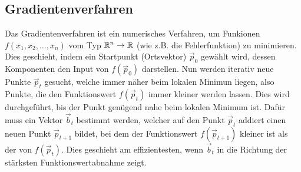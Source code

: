 \begin{appendices}

\chapter{Gradientenverfahren}\label{sec:anhang_gd}
Das Gradientenverfahren ist ein numerisches Verfahren, um Funkionen $f(x_1,
x_2, \ldots, x_n)$ vom Typ $\mathbb{R}^n \to \mathbb{R}$ (wie z.B. die Fehlerfunktion)
zu minimieren.
Dies geschieht, indem ein Startpunkt (Ortsvektor) $\vec{p}_0$ gewählt wird, dessen
Komponenten den Input von $f(\vec{p}_0)$ darstellen.
Nun werden iterativ neue Punkte $\vec{p}_t$ gesucht, welche immer näher beim lokalen Minimun liegen, also Punkte, die den Funktionswert $f(\vec{p}_t)$ immer kleiner werden lassen.
Dies wird durchgeführt, bis der Punkt genügend nahe beim lokalen Minimum ist.
\para{}
Dafür muss ein Vektor $\vec{b}_t$ bestimmt werden, welcher auf den Punkt $\vec{p}_t$ addiert einen neuen Punkt $\vec{p}_{t+1}$ bildet,
bei dem der Funktionswert $f(\vec{p}_{t+1})$ kleiner ist als der von $f(\vec{p}_t)$.
Dies geschieht am effizientesten, wenn $\vec{b}_t$ in die Richtung der stärksten Funktionswertabnahme zeigt.


\end{appendices}
